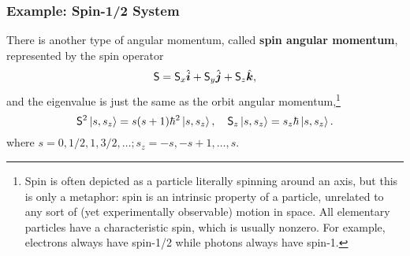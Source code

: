 \documentclass{article}
\newcommand{\ket}[1]{\left\vert #1\right\rangle}
\begin{document}
\subsubsection{Example: Spin-1/2 System}
There is another type of angular momentum, called \textbf{spin angular momentum}, represented by the spin operator
$$\mathsf S =\mathsf S_x\hat{\bm i}+\mathsf S_y\hat{\bm j}+\mathsf S_z\hat{\bm k},$$
and the eigenvalue is just the same as the orbit angular momentum,\footnote{Spin is often depicted as a particle literally spinning around an axis, but this is only a metaphor: spin is an intrinsic property of a particle, unrelated to any sort of (yet experimentally observable) motion in space. All elementary particles have a characteristic spin, which is usually nonzero. For example, electrons always have spin-1/2 while photons always have spin-1.}
$$\sS^2\ket{s,s_z}=s(s+1)\hbar^2\ket{s,s_z},\quad\sS_z\ket{s,s_z}=s_z\hbar\ket{s,s_z}.$$
where $s=0,1/2,1,3/2,\ldots;s_z=-s,-s+1,\ldots,s$.
\end{document}
